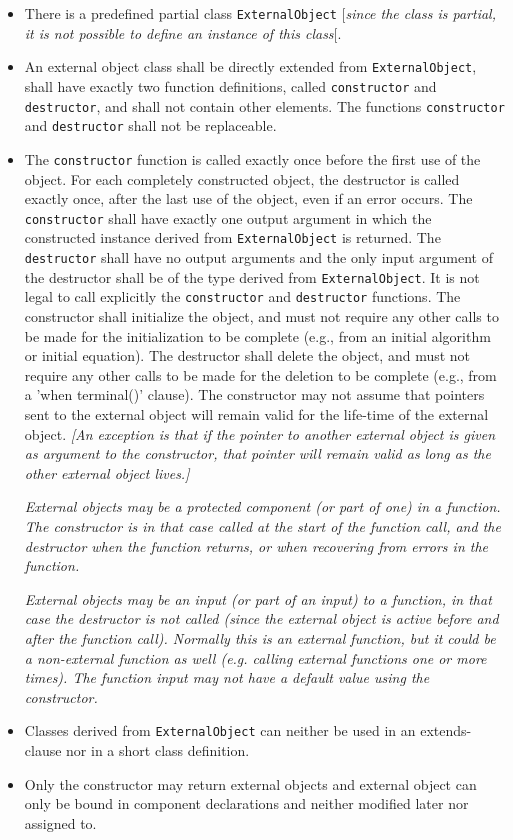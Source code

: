 \begin{itemize}
\item
  There is a predefined partial class \lstinline!ExternalObject! {[}\emph{since the class
  is partial, it is not possible to define an instance of this class}{[}.
\item
  An external object class shall be directly extended from
  \lstinline!ExternalObject!, shall have exactly two function definitions, called
  \lstinline!constructor! and \lstinline!destructor!, and shall not contain other elements.
  The functions \lstinline!constructor! and \lstinline!destructor! shall not be replaceable.
\item
  The \lstinline!constructor! function is called exactly once before the first use
  of the object. For each completely constructed object, the destructor
  is called exactly once, after the last use of the object, even if an
  error occurs. The \lstinline!constructor! shall have exactly one output argument
  in which the constructed instance derived from \lstinline!ExternalObject! is
  returned. The \lstinline!destructor! shall have no output arguments and the only
  input argument of the destructor shall be of the type derived from
  \lstinline!ExternalObject!. It is not legal to call explicitly the \lstinline!constructor! and
  \lstinline!destructor! functions. The constructor shall initialize the object, and
  must not require any other calls to be made for the initialization to
  be complete (e.g., from an initial algorithm or initial equation). The
  destructor shall delete the object, and must not require any other
  calls to be made for the deletion to be complete (e.g., from a 'when
  terminal()' clause). The constructor may not assume that pointers sent
  to the external object will remain valid for the life-time of the
  external object. \emph{{[}An exception is that if the pointer to
  another external object is given as argument to the constructor, that
  pointer will remain valid as long as the other external object
  lives.{]}}

  \emph{External objects may be a protected component (or part of one)
  in a function. The constructor is in that case called at the start of
  the function call, and the destructor when the function returns, or
  when recovering from errors in the function.}

  \emph{External objects may be an input (or part of an input) to a
  function, in that case the destructor is not called (since the
  external object is active before and after the function call).
  Normally this is an external function, but it could be a non-external
  function as well (e.g. calling external functions one or more times).
  The function input may not have a default value using the
  constructor.}
\item
  Classes derived from \lstinline!ExternalObject! can neither be used in an
  extends-clause nor in a short class definition.
\item
  Only the constructor may return external objects and external object
  can only be bound in component declarations and neither modified later
  nor assigned to.


\end{itemize}
